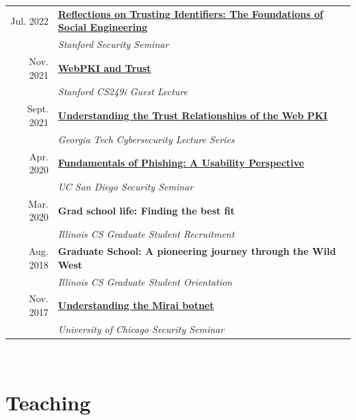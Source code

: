 \documentclass[10pt,singlecolumn]{article} %
\begin{document}
\begin{tabular}{rl}

Jul. 2022 & \textbf{\href{https://zanema.com/slides/stanford_se.pdf}{Reflections on Trusting Identifiers: The Foundations of Social Engineering}}\\
& \emph{Stanford Security Seminar}\\

Nov. 2021 & \textbf{\href{https://zanema.com/slides/CS249i-WebPKI.pdf}{WebPKI and Trust}}\\
& \emph{Stanford CS249i Guest Lecture}\\

Sept. 2021 & \textbf{\href{https://zanema.com/slides/gt_lecture_trust.pdf}{Understanding the Trust Relationships of the Web PKI}}\\
& \emph{Georgia Tech Cybersecurity Lecture Series}\\

Apr. 2020 & \textbf{\href{https://zanema.com/slides/ucsd_phishing.pdf}{Fundamentals of Phishing: A Usability Perspective}}\\
& \emph{UC San Diego Security Seminar}\\

Mar. 2020 & \textbf{Grad school life: Finding the best fit}\\
& \emph{Illinois CS Graduate Student Recruitment}\\

Aug. 2018 & \textbf{Graduate School: A pioneering journey through the Wild West}\\
& \emph{Illinois CS Graduate Student Orientation}\\

Nov. 2017 & \textbf{\href{https://zanema.com/slides/uchicago_mirai.pdf}{Understanding the Mirai botnet}}\\
& \emph{University of Chicago Security Seminar}\\
\end{tabular} \\




\section{Teaching} 
\end{document}

